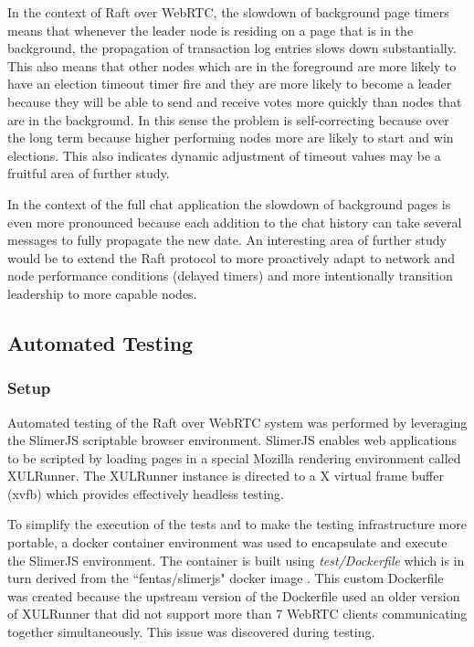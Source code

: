 \documentclass[9pt]{extarticle}
\begin{document}
\begin{multicols}{2}
In the context of Raft over WebRTC, the slowdown of background page
timers means that whenever the leader node is residing on a page that
is in the background, the propagation of transaction log entries slows
down substantially. This also means that other nodes which are in the
foreground are more likely to have an election timeout timer fire and
they are more likely to become a leader because they will be able to
send and receive votes more quickly than nodes that are in the
background.  In this sense the problem is self-correcting because over
the long term because higher performing nodes more are likely to start
and win elections. This also indicates dynamic adjustment of timeout
values may be a fruitful area of further study.

In the context of the full chat application the slowdown of background
pages is even more pronounced because each addition to the chat
history can take several messages to fully propagate the new date. An
interesting area of further study would be to extend the Raft protocol
to more proactively adapt to network and node performance conditions
(delayed timers) and more intentionally transition leadership to more
capable nodes.


\subsection{Automated Testing}

\subsubsection{Setup}

Automated testing of the Raft over WebRTC system was performed by
leveraging the SlimerJS scriptable browser environment. SlimerJS
enables web applications to be scripted by loading pages in a special
Mozilla rendering environment called XULRunner. The XULRunner instance
is directed to a X virtual frame buffer (xvfb) which provides
effectively headless testing.

To simplify the execution of the tests and to make the testing
infrastructure more portable, a docker container environment was used
to encapsulate and execute the SlimerJS environment. The container is
built using \emph{test/Dockerfile} which is in turn derived from
the ``fentas/slimerjs" docker image \cite{fentas:slimerjs}.
This custom Dockerfile was created because the upstream version of the
Dockerfile used an older version of XULRunner that did not support
more than 7 WebRTC clients communicating together simultaneously. This
issue was discovered during testing.


\end{multicols}
\end{document}
